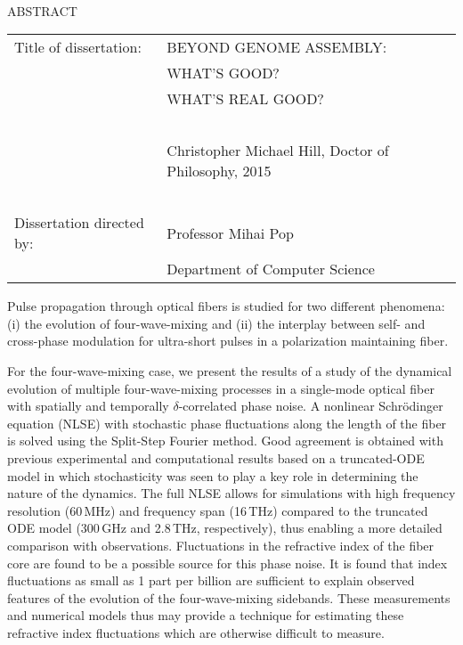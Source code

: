 
\hbox{\ }

\renewcommand{\baselinestretch}{1}
\small \normalsize

\begin{center}
\large{{ABSTRACT}} 

\vspace{3em} 

\end{center}
\hspace{-.15in}
\begin{tabular}{ll}
Title of dissertation:    & {\large  BEYOND GENOME ASSEMBLY: }\\
&				      {\large  WHAT'S GOOD?} \\
&				      {\large  WHAT'S REAL GOOD?} \\
\ \\
&                          {\large  Christopher Michael Hill, Doctor of Philosophy, 2015} \\
\ \\
Dissertation directed by: & {\large  Professor Mihai Pop} \\
&  				{\large	 Department of Computer Science } \\
\end{tabular}

\vspace{3em}

\renewcommand{\baselinestretch}{2}
\large \normalsize

Pulse propagation through optical fibers is studied for two different phenomena: (i) the evolution of four-wave-mixing and (ii) the interplay between self- and cross-phase modulation for ultra-short pulses in a polarization maintaining fiber.

For the four-wave-mixing case, we present the results of a study of the dynamical evolution of multiple four-wave-mixing processes in a single-mode optical fiber with spatially and temporally $\delta$-correlated phase noise. A nonlinear Schr\"odinger equation (NLSE) with stochastic phase fluctuations along the length of the fiber is solved using the Split-Step Fourier method. Good agreement is obtained with previous experimental and computational results based on a truncated-ODE model in which stochasticity was seen to play a key role in determining the nature of the dynamics. The full NLSE allows for simulations with high frequency resolution (60\,MHz) and frequency span (16\,THz) compared to the truncated ODE model (300\,GHz and 2.8\,THz, respectively), thus enabling a more detailed comparison with observations. Fluctuations in the refractive index of the fiber core are found to be a possible source for this phase noise. It is found that index fluctuations as small as 1 part per billion are sufficient to explain observed features of the evolution of the four-wave-mixing sidebands. These measurements and numerical models thus may provide a technique for estimating these refractive index fluctuations which are otherwise difficult to measure.

